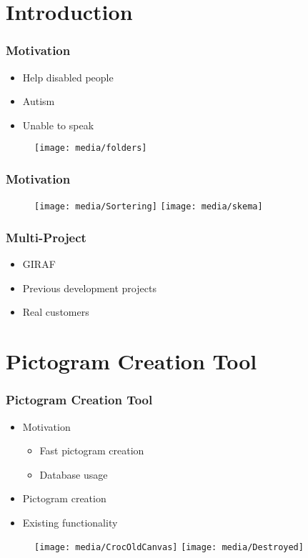 


\section{Introduction}
\begin{frame}
	\frametitle{Motivation}
	\begin{itemize}
		\item Help disabled people
		\item Autism
		\item Unable to speak
	\end{itemize}
	\begin{figure}
		\texttt{[image: media/folders]}
	\end{figure}
\end{frame}

\begin{frame}
	\frametitle{Motivation}
	\begin{figure}
		\texttt{[image: media/Sortering]}		
		\hfill
		\texttt{[image: media/skema]}
	\end{figure}
\end{frame}

\begin{frame}
	\frametitle{Multi-Project}
	\begin{itemize}
		\item GIRAF
		\item Previous development projects
		\item Real customers
	\end{itemize}
\end{frame}
	
	
	
\section{Pictogram Creation Tool}
\begin{frame}
	\frametitle{Pictogram Creation Tool}
	\begin{itemize}
		\item Motivation
		\begin{itemize}
			\item Fast pictogram creation
			\item Database usage
		\end{itemize}
		\item Pictogram creation
		\item Existing functionality
	\end{itemize}
	\begin{figure}
		\texttt{[image: media/CrocOldCanvas]}
		\hfill
		\texttt{[image: media/Destroyed]}
	\end{figure}
\end{frame}